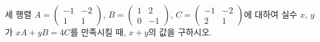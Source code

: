 \hspace*{2mm}\begin{minipage}[t]{\dimexpr\linewidth-2mm\relax}\vspace{0pt}
세 행렬 $A=\begin{pmatrix} -1 & -2 \\ 1 & 1 \end{pmatrix}$, $B=\begin{pmatrix} 1 & 2 \\ 0 & -1 \end{pmatrix}$, $C=\begin{pmatrix} -1 & -2 \\ 2 & 1 \end{pmatrix}$에 대하여 실수 $x$, $y$가 $xA+yB=4C$를 만족시킬 때, $x+y$의 값을 구하시오.\end{minipage}

